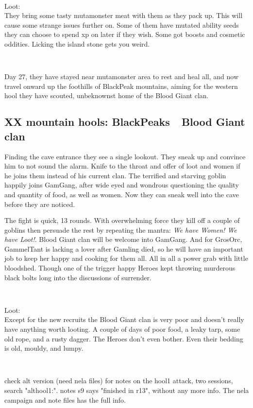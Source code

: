 \

Loot:\\
They bring some tasty mutamonster meat with them as they pack up. This will cause some strange issues further on. Some of them have mutated ability seeds they can choose to spend xp on later if they wish. Some got boosts and cosmetic oddities. Licking the island stone gets you weird.

\

Day 27, they have stayed near mutamonster area to rest and heal all, and now travel onward up the foothills of BlackPeak mountains, aiming for the western hool they have scouted, unbeknownst home of the Blood Giant clan.


\subsection*{XX mountain hools: BlackPeaks~\mdash~Blood Giant clan}

Finding the cave entrance they see a single lookout. They sneak up and convince him to not sound the alarm. Knife to the throat and offer of loot and women if he joins them instead of his current clan. The terrified and starving goblin happily joins GamGang, after wide eyed and wondrous questioning the quality and quantity of food, as well as women. Now they can sneak well into the cave before they are noticed.

The fight is quick, 13 rounds. With overwhelming force they kill off a couple of goblins then persuade the rest by repeating the mantra: \emph{We have Women! We have Loot!}. Blood Giant clan will be welcome into GamGang. And for GrosOrc, GammelTant is lacking a lover after Gamling died, so he will have an important job to keep her happy and cooking for them all. All in all a power grab with little bloodshed. Though one of the trigger happy Heroes kept throwing murderous black bolts long into the discussions of surrender.

\

Loot:\\
Except for the new recruits the Blood Giant clan is very poor and doesn't really have anything worth looting. A couple of days of poor food, a leaky tarp, some old rope, and a rusty dagger. The Heroes don't even bother. Even their bedding is old, mouldy, and lumpy.

\

\todo check alt version (need nela files) for notes on the hool1 attack, two sessions, search "althool1:". notes s9 says "finished in r13", without any more info. The nela campaign and note files has the full info.


